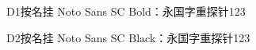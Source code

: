 \documentclass[fontset=none]{ctexart}
\begin{document}
\fontsize{22pt}{36pt}\selectfont
D1按名挂 Noto Sans SC Bold：{\vfNamedBold 永国字重探针123}

D2按名挂 Noto Sans SC Black：{\vfNamedBlack 永国字重探针123}
\end{document}
